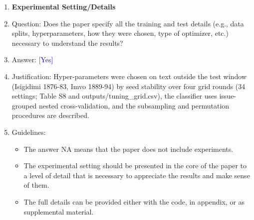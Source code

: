 \documentclass[10pt,letterpaper]{article}
\newcommand{\answerYes}[1][]{\textcolor{blue}{[Yes] #1}}
\begin{document}
\begin{enumerate}
\item {\bf Experimental Setting/Details}
    \item[] Question: Does the paper specify all the training and test details (e.g., data splits, hyperparameters, how they were chosen, type of optimizer, etc.) necessary to understand the results?
    \item[] Answer: \answerYes{}
    \item[] Justification: Hyper-parameters were chosen on text outside the test window (Isigidimi 1876-83, Imvo 1889-94) by seed stability over four grid rounds (34 settings; Table S8 and outputs/tuning\_grid.csv), the classifier uses issue-grouped nested cross-validation, and the subsampling and permutation procedures are described.
    \item[] Guidelines:
    \begin{itemize}
        \item The answer NA means that the paper does not include experiments.
        \item The experimental setting should be presented in the core of the paper to a level of detail that is necessary to appreciate the results and make sense of them.
        \item The full details can be provided either with the code, in appendix, or as supplemental material.
    \end{itemize}


\end{enumerate}
\end{document}
